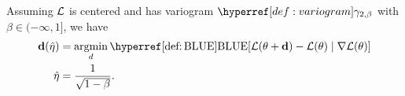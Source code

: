 
\begin{theorem}
	Assuming \(\mathcal{L}\) is centered and has variogram \(\variogram_{2,\beta}\)
	with \(\beta\in(-\infty, 1]\), we have
	\begin{align*}
		\step(\hat{\lr})
		&= \argmin_{d}
		\BLUE[\Loss(\param + \step) - \Loss(\param)\mid \grad\Loss(\param)]\\
		\hat{\lr}
		&= \frac1{\sqrt{1-\beta}}.
	\end{align*}
\end{theorem}
